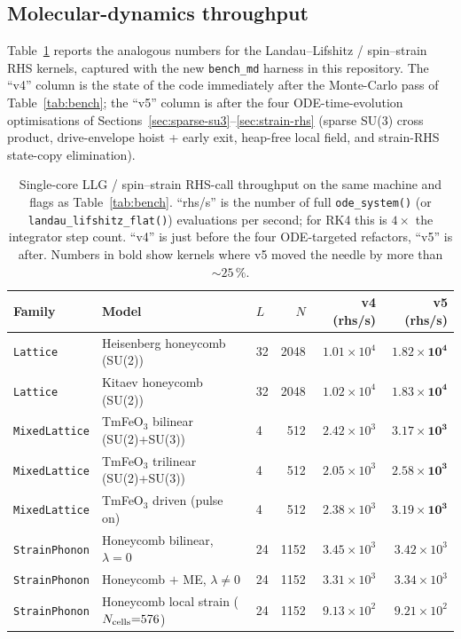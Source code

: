\documentclass[11pt,letterpaper]{article}
\begin{document}
\subsection{Molecular-dynamics throughput}
\label{sec:bench-md}

Table~\ref{tab:bench-md} reports the analogous numbers for the
Landau--Lifshitz / spin--strain RHS kernels, captured with the new
\texttt{bench\_md} harness in this repository.  The ``v4'' column is
the state of the code immediately after the Monte-Carlo pass of
Table~\ref{tab:bench}; the ``v5'' column is after the four
ODE-time-evolution optimisations of
Sections~\ref{sec:sparse-su3}--\ref{sec:strain-rhs} (sparse SU(3)
cross product, drive-envelope hoist + early exit, heap-free local
field, and strain-RHS state-copy elimination).

\begin{table}[t]
\centering
\caption{Single-core LLG / spin--strain RHS-call throughput on the same
machine and flags as Table~\ref{tab:bench}.  ``rhs/s'' is the number
of full \texttt{ode\_system()} (or \texttt{landau\_lifshitz\_flat()})
evaluations per second; for RK4 this is $4 \times$ the integrator step
count.  ``v4'' is just before the four ODE-targeted refactors,
``v5'' is after.  Numbers in bold show kernels where v5 moved the
needle by more than $\sim 25\,\%$.}
\label{tab:bench-md}
\begin{tabular}{lllrrr}
\toprule
Family & Model & $L$ & $N$ & v4 (rhs/s) & v5 (rhs/s) \\
\midrule
\texttt{Lattice} & Heisenberg honeycomb (SU(2))           & 32 & 2048 & $1.01{\times}10^{4}$ & $\mathbf{1.82{\times}10^{4}}$ \\
\texttt{Lattice} & Kitaev honeycomb (SU(2))               & 32 & 2048 & $1.02{\times}10^{4}$ & $\mathbf{1.83{\times}10^{4}}$ \\
\midrule
\texttt{MixedLattice} & TmFeO$_3$ bilinear  (SU(2)+SU(3)) & 4  & 512  & $2.42{\times}10^{3}$ & $\mathbf{3.17{\times}10^{3}}$ \\
\texttt{MixedLattice} & TmFeO$_3$ trilinear (SU(2)+SU(3)) & 4  & 512  & $2.05{\times}10^{3}$ & $\mathbf{2.58{\times}10^{3}}$ \\
\texttt{MixedLattice} & TmFeO$_3$ driven (pulse on)       & 4  & 512  & $2.38{\times}10^{3}$ & $\mathbf{3.19{\times}10^{3}}$ \\
\midrule
\texttt{StrainPhonon} & Honeycomb bilinear, $\lambda{=}0$ & 24 & 1152 & $3.45{\times}10^{3}$ & $3.42{\times}10^{3}$ \\
\texttt{StrainPhonon} & Honeycomb $+$ ME, $\lambda{\ne}0$ & 24 & 1152 & $3.31{\times}10^{3}$ & $3.34{\times}10^{3}$ \\
\texttt{StrainPhonon} & Honeycomb local strain ($N_{\rm cells}{=}576$) & 24 & 1152 & $9.13{\times}10^{2}$ & $9.21{\times}10^{2}$ \\
\bottomrule
\end{tabular}
\end{table}
\end{document}
